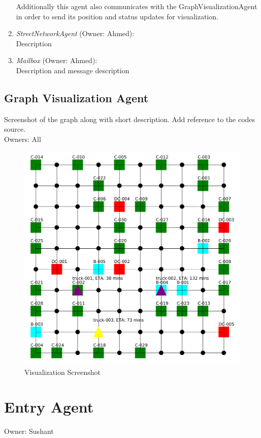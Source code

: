 \documentclass[11pt, a4paper]{article}
\begin{document}
\begin{enumerate}
	Additionally this agent also communicates with the GraphVisualizationAgent in order to send its position and status updates for visualization. 
	\item \textit{StreetNetworkAgent} (Owner: Ahmed):\\
	Description
	\item \textit{Mailbox} (Owner: Ahmed):\\
	Description and message description
\end{enumerate}

\newpage
\subsection{Graph Visualization Agent}\label{GraphVisualizationAgent}
Screenshot of the graph along with short description. Add reference to the codes source. 
\\Owners: All

\begin{figure}[h!]
	\centering
	\includegraphics[width=\textwidth]{Visualization.png}
	\caption{Visualization Screenshot}
	\label{PackagingArchitecture}
\end{figure}

\newpage
\section{Entry Agent}
Owner: Sushant
\end{document}
